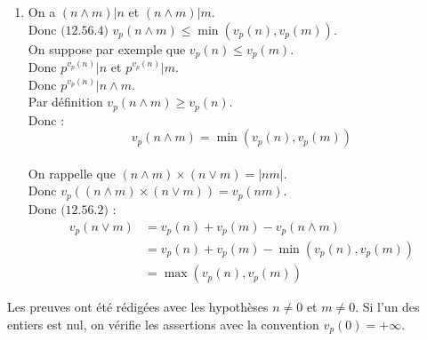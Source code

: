 \documentclass[../main.tex]{subfiles}
\begin{document}
\begin{enumerate}
    \item On a $(n \wedge m) | n$ et $(n \wedge m) | m$. \\
    Donc $\text{(12.56.4)}$ $\boxed{v_p(n \wedge m) \leq \min(v_p(n), v_p(m))}$. \\
    On suppose par exemple que $v_p(n) \leq v_p(m)$. \\
    Donc $p^{v_p(n)} | n$ et $p^{v_p(n)} | m$. \\
    Donc $p^{v_p(n)} | n \wedge m$. \\
    Par définition $\boxed{v_p(n \wedge m) \geq v_p(n)}$. \\
    Donc : 
    $$\boxed{v_p(n \wedge m) = \min(v_p(n), v_p(m))}$$
    \\
    On rappelle que $(n \wedge m) \times (n \vee m) = |nm|$. \\
    Donc $v_p((n \wedge m) \times (n \vee m)) = v_p(nm)$. \\
    Donc $\text{(12.56.2)}$ :
    \begin{align*}
        v_p(n \vee m) &= v_p(n) + v_p(m) - v_p(n \wedge m) \\
        &= v_p(n) + v_p(m) - \min(v_p(n), v_p(m)) \\
        &= \boxed{\max(v_p(n), v_p(m))}
    \end{align*}
\end{enumerate}
Les preuves ont été rédigées avec les hypothèses $n \neq 0$ et $m \neq 0$. Si l'un des entiers est nul, on vérifie les assertions avec la convention $v_p(0) = +\infty$.
\end{document}
